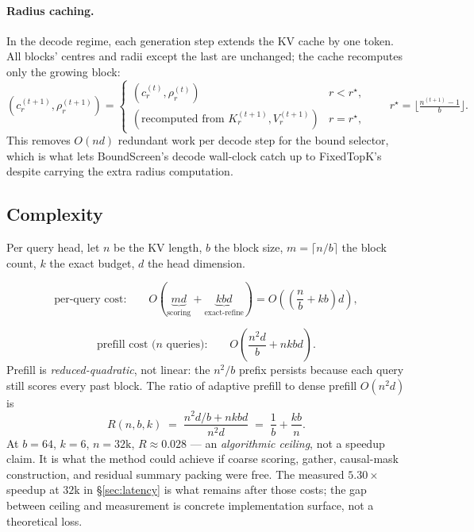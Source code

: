 \documentclass[11pt]{article}
\theoremstyle{plain}
\theoremstyle{definition}
\begin{document}
\paragraph{Radius caching.}
In the decode regime, each generation step extends the KV cache by one
token. All blocks' centres and radii except the last are unchanged; the
cache recomputes only the growing block:
\begin{equation}
(c_r^{(t+1)}, \rho_r^{(t+1)}) =
\begin{cases}
(c_r^{(t)}, \rho_r^{(t)}) & r < r^\star, \\
(\text{recomputed from } K_r^{(t+1)}, V_r^{(t+1)}) & r = r^\star,
\end{cases} \qquad r^\star = \bigl\lfloor \tfrac{n^{(t+1)} - 1}{b} \bigr\rfloor. \label{eq:radcache}
\end{equation}
This removes $O(n d)$ redundant work per decode step for the bound
selector, which is what lets BoundScreen's decode wall-clock catch up to
FixedTopK's despite carrying the extra radius computation.

\subsection{Complexity}
\label{sec:complexity}

Per query head, let $n$ be the KV length, $b$ the block size,
$m = \lceil n/b \rceil$ the block count, $k$ the exact budget, $d$ the
head dimension.

\begin{equation}
\text{per-query cost:}\qquad O\!\left(\underbrace{m d}_{\text{scoring}} + \underbrace{k b d}_{\text{exact-refine}}\right) = O\!\left(\!\left(\frac{n}{b} + k b\right) d\right), \label{eq:perquery-cost}
\end{equation}

\begin{equation}
\text{prefill cost ($n$ queries):}\qquad O\!\left(\frac{n^2 d}{b} + n k b d\right). \label{eq:prefill-cost}
\end{equation}
Prefill is \emph{reduced-quadratic}, not linear: the $n^2/b$ prefix
persists because each query still scores every past block. The ratio of
adaptive prefill to dense prefill $O(n^2 d)$ is
\begin{equation}
R(n, b, k) \;=\; \frac{n^2 d / b + n k b d}{n^2 d} \;=\; \frac{1}{b} + \frac{k b}{n}. \label{eq:ratio}
\end{equation}
At $b = 64$, $k = 6$, $n = 32\mathrm{k}$, $R \approx 0.028$ --- an
\emph{algorithmic ceiling}, not a speedup claim. It is what the method
could achieve if coarse scoring, gather, causal-mask construction, and
residual summary packing were free. The measured $5.30\times$ speedup at
$32\mathrm{k}$ in \S\ref{sec:latency} is what remains after those costs;
the gap between ceiling and measurement is concrete implementation surface,
not a theoretical loss.
\end{document}

